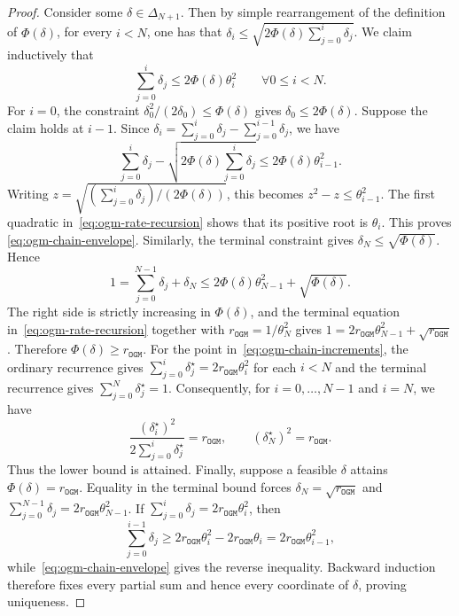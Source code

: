 \documentclass[11pt]{article}
\begin{document}
\begin{proof}
Consider some $\delta\in \Delta_{N+1}$. Then by simple rearrangement of the definition of $\Phi(\delta)$, for every
$i<N$, one has that $\delta_i \leq\sqrt{2 \Phi(\delta) \sum_{j=0}^i\delta_j}$.
We claim inductively that
\begin{equation}\label{eq:ogm-chain-envelope}
    \sum_{j=0}^i\delta_j\leq2\Phi(\delta)\theta_i^2
    \qquad \forall 0\leq i<N.
\end{equation}
For $i=0$, the constraint $\delta_0^2/(2\delta_0)\leq\Phi(\delta)$ gives
$\delta_0\leq2\Phi(\delta)$. Suppose the claim holds at $i-1$. Since
$\delta_i=\sum_{j=0}^i\delta_j-\sum_{j=0}^{i-1}\delta_j$, we have
\[
    \sum_{j=0}^i\delta_j
    -\sqrt{2\Phi(\delta)\sum_{j=0}^i\delta_j}
    \leq2\Phi(\delta)\theta_{i-1}^2.
\]
Writing
$z=\sqrt{(\sum_{j=0}^i\delta_j)/(2\Phi(\delta))}$, this becomes
$z^2-z\leq\theta_{i-1}^2$. The first quadratic in~\eqref{eq:ogm-rate-recursion} shows that its positive root is $\theta_i$. This proves
\eqref{eq:ogm-chain-envelope}. Similarly, the terminal constraint gives $\delta_N\leq\sqrt{\Phi(\delta)}$. Hence
\[
    1
    =\sum_{j=0}^{N-1}\delta_j+\delta_N
    \leq2\Phi(\delta)\theta_{N-1}^2+\sqrt{\Phi(\delta)}.
\]
The right side is strictly increasing in $\Phi(\delta)$, and the terminal equation
in~\eqref{eq:ogm-rate-recursion} together with $r_\mathtt{OGM}=1/\theta_N^2$ gives
$1=2r_\mathtt{OGM}\theta_{N-1}^2+\sqrt{r_\mathtt{OGM}}$. Therefore $\Phi(\delta)\geq r_\mathtt{OGM}$.
For the point in~\eqref{eq:ogm-chain-increments}, the ordinary recurrence gives $\sum_{j=0}^i\delta_j^\star=2r_\mathtt{OGM}\theta_i^2$ for each $i<N$ and the terminal recurrence gives
$\sum_{j=0}^N\delta_j^\star=1$. Consequently, for $i=0,\dots,N-1$ and $i=N$, we have
\[
    \frac{(\delta_i^\star)^2}
    {2\sum_{j=0}^i\delta_j^\star}
    =r_\mathtt{OGM},
    \qquad
    (\delta_N^\star)^2=r_\mathtt{OGM}.
\]
Thus the lower bound is attained.
Finally, suppose a feasible $\delta$ attains $\Phi(\delta)=r_\mathtt{OGM}$. Equality in the
terminal bound forces
$\delta_N=\sqrt{r_\mathtt{OGM}}$ and
$\sum_{j=0}^{N-1}\delta_j=2r_\mathtt{OGM}\theta_{N-1}^2$. If
$\sum_{j=0}^i\delta_j=2r_\mathtt{OGM}\theta_i^2$, then
\[
    \sum_{j=0}^{i-1}\delta_j
    \geq
    2r_\mathtt{OGM}\theta_i^2-2r_\mathtt{OGM}\theta_i
    =2r_\mathtt{OGM}\theta_{i-1}^2,
\]
while~\eqref{eq:ogm-chain-envelope} gives the reverse inequality.
Backward induction therefore fixes every partial sum and hence every
coordinate of $\delta$, proving uniqueness.
\end{proof}
\end{document}
